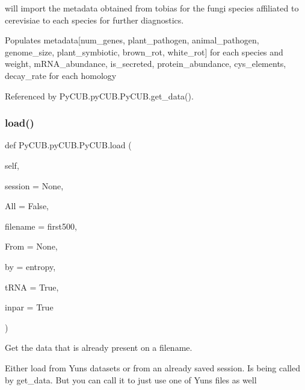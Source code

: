 will import the metadata obtained from tobias for the fungi species affiliated to cerevisiae to each species for further diagnostics. 

Populates metadata\mbox{[}num\+\_\+genes, plant\+\_\+pathogen, animal\+\_\+pathogen, genome\+\_\+size, plant\+\_\+symbiotic, brown\+\_\+rot, white\+\_\+rot\mbox{]} for each species and weight, m\+R\+N\+A\+\_\+abundance, is\+\_\+secreted, protein\+\_\+abundance, cys\+\_\+elements, decay\+\_\+rate for each homology 

Referenced by Py\+C\+U\+B.\+py\+C\+U\+B.\+Py\+C\+U\+B.\+get\+\_\+data().

\mbox{\label{class_py_c_u_b_1_1py_c_u_b_1_1_py_c_u_b_ab471e823b0eba23af5a5322008ec09da}} 
\subsubsection{\texorpdfstring{load()}{load()}}
{\footnotesize\ttfamily def Py\+C\+U\+B.\+py\+C\+U\+B.\+Py\+C\+U\+B.\+load (\begin{DoxyParamCaption}\item[{}]{self,  }\item[{}]{session = {\ttfamily None},  }\item[{}]{All = {\ttfamily False},  }\item[{}]{filename = {\ttfamily \textquotesingle{}first500\textquotesingle{}},  }\item[{}]{From = {\ttfamily None},  }\item[{}]{by = {\ttfamily \textquotesingle{}entropy\textquotesingle{}},  }\item[{}]{t\+R\+NA = {\ttfamily True},  }\item[{}]{inpar = {\ttfamily True} }\end{DoxyParamCaption})}



Get the data that is already present on a filename. 

Either load from Yun\textquotesingle{}s datasets or from an already saved session. Is being called by get\+\_\+data. But you can call it to just use one of Yun\textquotesingle{}s files as well


